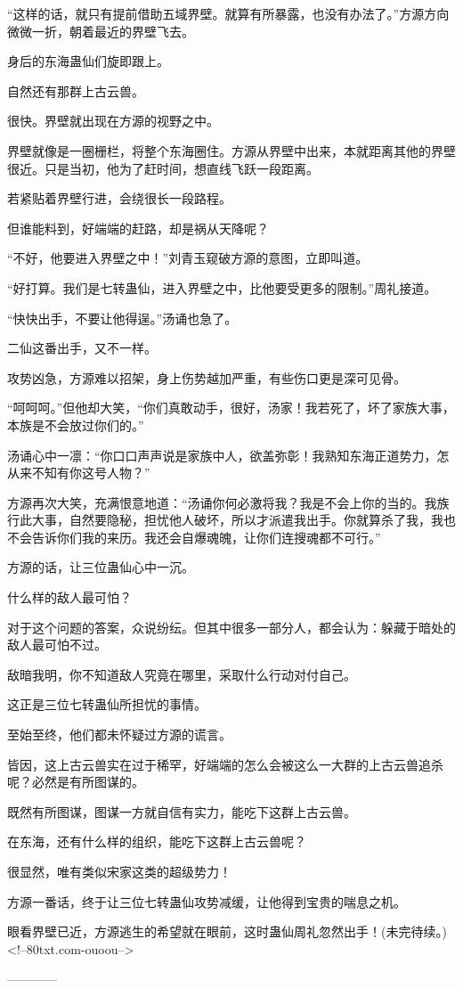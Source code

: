 \begin{this_body}
“这样的话，就只有提前借助五域界壁。就算有所暴露，也没有办法了。”方源方向微微一折，朝着最近的界壁飞去。

身后的东海蛊仙们旋即跟上。

自然还有那群上古云兽。

很快。界壁就出现在方源的视野之中。

界壁就像是一圈栅栏，将整个东海圈住。方源从界壁中出来，本就距离其他的界壁很近。只是当初，他为了赶时间，想直线飞跃一段距离。

若紧贴着界壁行进，会绕很长一段路程。

但谁能料到，好端端的赶路，却是祸从天降呢？

“不好，他要进入界壁之中！”刘青玉窥破方源的意图，立即叫道。

“好打算。我们是七转蛊仙，进入界壁之中，比他要受更多的限制。”周礼接道。

“快快出手，不要让他得逞。”汤诵也急了。

二仙这番出手，又不一样。

攻势凶急，方源难以招架，身上伤势越加严重，有些伤口更是深可见骨。

“呵呵呵。”但他却大笑，“你们真敢动手，很好，汤家！我若死了，坏了家族大事，本族是不会放过你们的。”

汤诵心中一凛：“你口口声声说是家族中人，欲盖弥彰！我熟知东海正道势力，怎从来不知有你这号人物？”

方源再次大笑，充满恨意地道：“汤诵你何必激将我？我是不会上你的当的。我族行此大事，自然要隐秘，担忧他人破坏，所以才派遣我出手。你就算杀了我，我也不会告诉你们我的来历。我还会自爆魂魄，让你们连搜魂都不可行。”

方源的话，让三位蛊仙心中一沉。

什么样的敌人最可怕？

对于这个问题的答案，众说纷纭。但其中很多一部分人，都会认为：躲藏于暗处的敌人最可怕不过。

敌暗我明，你不知道敌人究竟在哪里，采取什么行动对付自己。

这正是三位七转蛊仙所担忧的事情。

至始至终，他们都未怀疑过方源的谎言。

皆因，这上古云兽实在过于稀罕，好端端的怎么会被这么一大群的上古云兽追杀呢？必然是有所图谋的。

既然有所图谋，图谋一方就自信有实力，能吃下这群上古云兽。

在东海，还有什么样的组织，能吃下这群上古云兽呢？

很显然，唯有类似宋家这类的超级势力！

方源一番话，终于让三位七转蛊仙攻势减缓，让他得到宝贵的喘息之机。

眼看界壁已近，方源逃生的希望就在眼前，这时蛊仙周礼忽然出手！(未完待续。)<!--80txt.com-ouoou-->

------------

\end{this_body}

